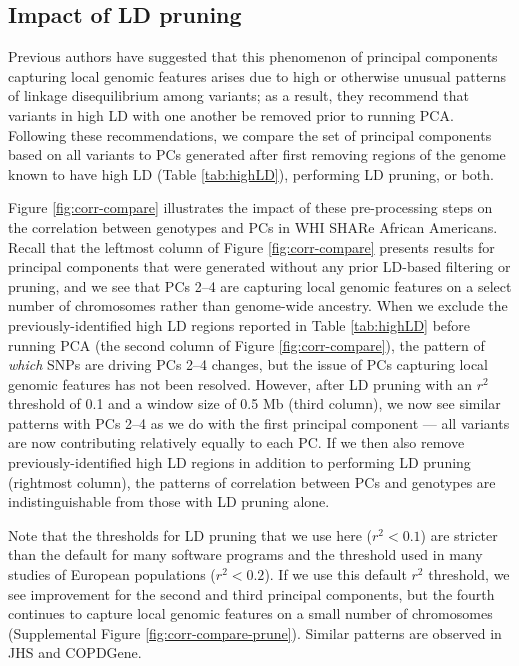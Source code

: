 \documentclass[12pt]{article}
\begin{document}
\subsection{Impact of LD pruning}

Previous authors have suggested that this phenomenon of principal components capturing local genomic features arises due to high or otherwise unusual patterns of linkage disequilibrium among variants; as a result, they recommend that variants in high LD with one another be removed prior to running PCA. 
Following these recommendations, we compare the set of principal components based on all variants to PCs generated after first removing regions of the genome known to have high LD (Table \ref{tab:highLD}), performing LD pruning, or both. 

Figure \ref{fig:corr-compare} illustrates the impact of these pre-processing steps on the correlation between genotypes and PCs in WHI SHARe African Americans. 
Recall that the leftmost column of Figure \ref{fig:corr-compare} presents results for principal components that were generated without any prior LD-based filtering or pruning, and we see that PCs 2--4 are capturing local genomic features on a select number of chromosomes rather than genome-wide ancestry.
When we exclude the previously-identified high LD regions reported in Table \ref{tab:highLD} before running PCA (the second column of Figure \ref{fig:corr-compare}), the pattern of \textit{which} SNPs are driving PCs 2--4 changes, but the issue of PCs capturing local genomic features has not been resolved. 
However, after LD pruning with an $r^2$ threshold of 0.1 and a window size of 0.5 Mb (third column), we now see similar patterns with PCs 2--4 as we do with the first principal component --- all variants are now contributing relatively equally to each PC. 
If we then also remove previously-identified high LD regions in addition to performing LD pruning (rightmost column), the patterns of correlation between PCs and genotypes are indistinguishable from those with LD pruning alone. 

Note that the thresholds for LD pruning that we use here ($r^2 < 0.1$) are stricter than the default for many software programs and the threshold used in many studies of European populations ($r^2 < 0.2$).
If we use this default $r^2$ threshold, we see improvement for the second and third principal components, but the fourth continues to capture local genomic features on a small number of chromosomes (Supplemental Figure \ref{fig:corr-compare-prune}). 
Similar patterns are observed in JHS and COPDGene.
\end{document}
